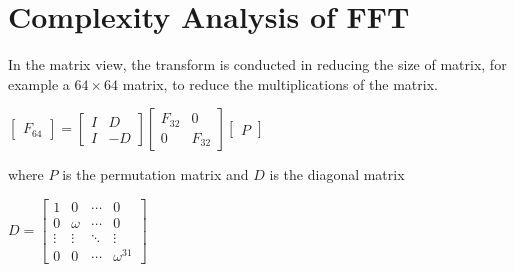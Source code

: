 \documentclass[12pt]{article}
\begin{document}
	
	\section{Complexity Analysis of FFT}
		In the matrix view, the transform is conducted in reducing the size of matrix, for example a $64 \times 64$ matrix, to reduce the multiplications of the matrix.
		\begin{center}
			\centering
			
			$
			\begin{bmatrix}
			F_{64}
			\end{bmatrix}
			=
			\begin{bmatrix}
			I & D\\
			I & -D
			\end{bmatrix}
			\begin{bmatrix}
			F_{32} & 0\\
			0 & F_{32}
			\end{bmatrix}
			\begin{bmatrix}
			P
			\end{bmatrix}
			$
			
			
		\end{center}
		where $P$ is the permutation matrix and $D$ is the diagonal matrix 
		\begin{center}
			\centering
				$D = \begin{bmatrix}
				1 & 0 & \cdots & 0\\
				0 & \omega & \cdots & 0\\
				\vdots & \vdots & \ddots & \vdots \\
				0 & 0 & \cdots & \omega^{31}
				\end{bmatrix}$
		\end{center}
		
\end{document}
